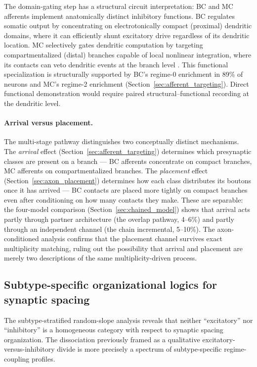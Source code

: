 \documentclass[11pt]{article}
\begin{document}
The domain-gating step has a structural circuit interpretation: BC and MC afferents implement anatomically distinct inhibitory functions. BC regulates somatic output by concentrating on electrotonically compact (proximal) dendritic domains, where it can efficiently shunt excitatory drive regardless of its dendritic location. MC selectively gates dendritic computation by targeting compartmentalized (distal) branches capable of local nonlinear integration, where its contacts can veto dendritic events at the branch level \citep{larkum2009}. This functional specialization is structurally supported by BC's regime-0 enrichment in 89\% of neurons and MC's regime-2 enrichment (Section~\ref{sec:afferent_targeting}). Direct functional demonstration would require paired structural--functional recording at the dendritic level.

\paragraph{Arrival versus placement.} The multi-stage pathway distinguishes two conceptually distinct mechanisms. The \textit{arrival} effect (Section~\ref{sec:afferent_targeting}) determines which presynaptic classes are present on a branch --- BC afferents concentrate on compact branches, MC afferents on compartmentalized branches. The \textit{placement} effect (Section~\ref{sec:axon_placement}) determines how each class distributes its boutons once it has arrived --- BC contacts are placed more tightly on compact branches even after conditioning on how many contacts they make. These are separable: the four-model comparison (Section~\ref{sec:chained_model}) shows that arrival acts partly through partner architecture (the overlap pathway, 4--6\%) and partly through an independent channel (the chain incremental, 5--10\%). The axon-conditioned analysis confirms that the placement channel survives exact multiplicity matching, ruling out the possibility that arrival and placement are merely two descriptions of the same multiplicity-driven process.


\subsection{Subtype-specific organizational logics for synaptic spacing}
\label{sec:subtype_logics}

The subtype-stratified random-slope analysis reveals that neither ``excitatory'' nor ``inhibitory'' is a homogeneous category with respect to synaptic spacing organization. The dissociation previously framed as a qualitative excitatory-versus-inhibitory divide is more precisely a spectrum of subtype-specific regime-coupling profiles.
\end{document}
